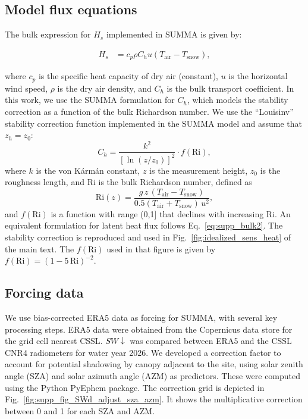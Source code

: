 \documentclass[draft,jgrga]{agutexSI2019}
\newcommand{\swdn}{\textcolor{black}{$SW\downarrow$}\xspace}
\begin{document}
\begin{article}
\subsection{Model flux equations}\label{supp:summa_desc_model_eq}

The bulk expression for $H_s$ implemented in SUMMA is given by:

\begin{align}
H_s &=  c_p \rho C_h u (T_{\mathrm{air}} - T_{\mathrm{snow}}) \label{eq:supp_bulk2},
\end{align}

where $c_p$ is the specific heat capacity of dry air (constant), $u$ is the horizontal wind speed, $\rho$ is the dry air density, and $C_h$ is the bulk transport coefficient.
In this work, we use the SUMMA formulation for $C_h$, which models the stability correction as a function of the bulk Richardson number.
We use the ``Louisinv'' stability correction function implemented in the SUMMA model and assume that $z_h = z_0$:
\begin{equation}
C_h = \frac{k^2}{[\ln(z/z_0)]^2}\cdot f(\mathrm{Ri}),
\end{equation}
where $k$ is the von K\'arm\'an constant, $z$ is the measurement height, $z_0$ is the roughness length, and Ri is the bulk Richardson number, defined as
\begin{equation} \label{eq:ri}
    \mathrm{Ri}(z) = \frac{g\, z\, (T_{\mathrm{air}} - T_{\mathrm{snow}})}{0.5(T_{\mathrm{air}} + T_{\mathrm{snow}})\, u^2},
\end{equation}
and $f(\mathrm{Ri})$ is a function with range (0,1] that declines with increasing Ri.
An equivalent formulation for latent heat flux follows Eq.~\ref{eq:supp_bulk2}.
The stability correction is reproduced and used in Fig.~\ref{fig:idealized_sens_heat} of the main text.
The $f(\mathrm{Ri})$ used in that figure is given by $f(\mathrm{Ri}) = (1 - 5\,\mathrm{Ri})^{-2}$.


\subsection{Forcing data}
We use bias-corrected ERA5 data as forcing for SUMMA, with several key processing steps.
ERA5 data were obtained from the Copernicus data store for the grid cell nearest CSSL.
\swdn was compared between ERA5 and the CSSL CNR4 radiometers for water year 2026.
We developed a correction factor to account for potential shadowing by canopy adjacent to the site, using solar zenith angle (SZA) and solar azimuth angle (AZM) as predictors.
These were computed using the Python PyEphem package.
The correction grid is depicted in Fig.~\ref{fig:supp_fig_SWd_adjust_sza_azm}.
It shows the multiplicative correction between 0 and 1 for each SZA and AZM.




\end{article}
\end{document}
